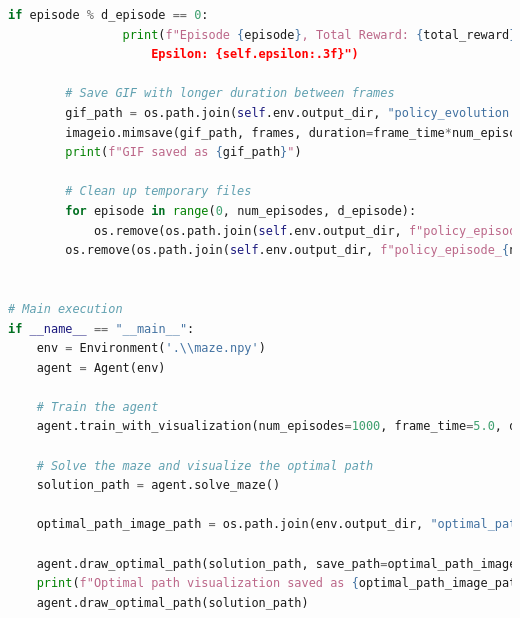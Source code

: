 \documentclass[11pt]{article}
\begin{document}
\begin{lstlisting}[language=Python]
            if episode % d_episode == 0:
                print(f"Episode {episode}, Total Reward: {total_reward},
                    Epsilon: {self.epsilon:.3f}")

        # Save GIF with longer duration between frames
        gif_path = os.path.join(self.env.output_dir, "policy_evolution.gif")
        imageio.mimsave(gif_path, frames, duration=frame_time*num_episodes/d_episode)
        print(f"GIF saved as {gif_path}")

        # Clean up temporary files
        for episode in range(0, num_episodes, d_episode):
            os.remove(os.path.join(self.env.output_dir, f"policy_episode_{episode}.png"))
        os.remove(os.path.join(self.env.output_dir, f"policy_episode_{num_episodes - 1}.png"))


# Main execution
if __name__ == "__main__":
    env = Environment('.\\maze.npy')
    agent = Agent(env)

    # Train the agent
    agent.train_with_visualization(num_episodes=1000, frame_time=5.0, d_episode=25)

    # Solve the maze and visualize the optimal path
    solution_path = agent.solve_maze()
    
    optimal_path_image_path = os.path.join(env.output_dir, "optimal_path.png")
    
    agent.draw_optimal_path(solution_path, save_path=optimal_path_image_path)
    print(f"Optimal path visualization saved as {optimal_path_image_path}")
    agent.draw_optimal_path(solution_path)
\end{lstlisting}
\end{document}
